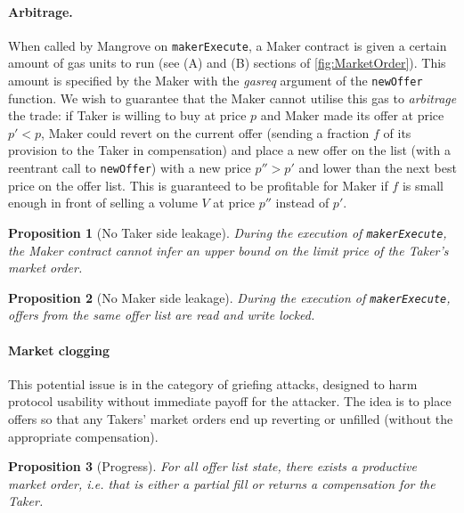 \documentclass[12pt]{extarticle}
\newtheorem{proposition}{Proposition}
\begin{document}
\paragraph{Arbitrage.}
When called by Mangrove on {\tt makerExecute}, a Maker contract is given a certain amount of gas units to run (see (A) and (B) sections of \autoref{fig:MarketOrder}). This amount is specified by the Maker with the \emph{gasreq} argument of the {\tt newOffer} function. We wish to guarantee that the Maker cannot utilise this gas to \emph{arbitrage} the trade: if Taker is willing to buy at price $p$ and Maker made its offer at price $p'<p$, Maker could revert on the current offer (sending a fraction $f$ of its provision to the Taker in compensation) and place a new offer on the list (with a reentrant call to {\tt newOffer}) with a new price $p''>p'$ and lower than the next best price on the offer list. This is guaranteed to be profitable for Maker if $f$ is small enough in front of selling a volume $V$ at price $p''$ instead of $p'$.
\begin{proposition}[No Taker side leakage]
During the execution of {\rm\texttt{makerExecute}}, the Maker contract cannot infer an upper bound on the limit price of the Taker's market order.
\end{proposition}

\begin{proposition}[No Maker side leakage]
During the execution of {\rm\texttt{makerExecute}}, offers from the same offer list are read and write locked.
\end{proposition}

\paragraph{Market clogging}
This potential issue is in the category of griefing attacks, designed to harm protocol usability without immediate payoff for the attacker. The idea is to place offers so that any Takers' market orders end up reverting or unfilled (without the appropriate compensation).    

\begin{proposition}[Progress]
For all offer list state, there exists a \emph{productive} market order, i.e. that is either a partial fill or returns a compensation for the Taker.
\end{proposition}
\end{document}
